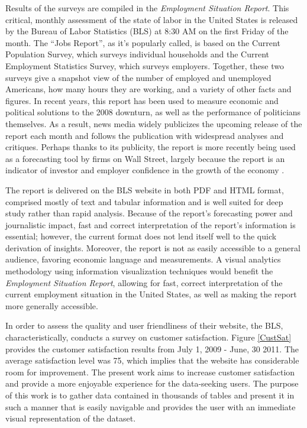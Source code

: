 \documentclass{sigchi}
\begin{document}
Results of the surveys are compiled in the \textit{Employment Situation Report}. This critical, monthly assessment of the state of labor in the United States is released by the Bureau of Labor Statistics (BLS) at 8:30 AM on the first Friday of the month. The ``Jobs Report'', as it's popularly called, is based on the Current Population Survey, which surveys individual households and the Current Employment Statistics Survey, which surveys employers. Together, these two surveys give a snapshot view of the number of employed and unemployed Americans, how many hours they are working, and a variety of other facts and figures. In recent years, this report has been used to measure economic and political solutions to the 2008 downturn, as well as the performance of politicians themselves. As a result, news media widely publicizes the upcoming release of the report each month and follows the publication with widespread analyses and critiques. Perhaps thanks to its publicity, the report is more recently being used as a forecasting tool by firms on Wall Street, largely because the report is an indicator of investor and employer confidence in the growth of the economy \cite{mahorney_what_2013}.

The report is delivered on the BLS website in both PDF and HTML format, comprised mostly of text and tabular information and is well suited for deep study rather than rapid analysis. Because of the report's forecasting power and journalistic impact, fast and correct interpretation of the report's information is essential; however, the current format does not lend itself well to the quick derivation of insights. Moreover, the report is not as easily accessible to a general audience, favoring economic language and measurements. A visual analytics methodology \cite{keim_mastering_2010} using information visualization techniques would benefit the \textit{Employment Situation Report}, allowing for fast, correct interpretation of the current employment situation in the United States, as well as making the report more generally accessible.

In order to assess the quality and user friendliness of their website, the BLS, characteristically, conducts a survey on customer satisfaction. Figure \ref{CustSat} provides the customer satisfaction results from July 1, 2009 - June, 30 2011. The average satisfaction level was 75, which implies that the website has considerable room for improvement. The present work aims to increase customer satisfaction and provide a more enjoyable experience for the data-seeking users. The purpose of this work is to gather data contained in thousands of tables and present it in such a manner that is easily navigable and provides the user with an immediate visual representation of the dataset.
\end{document}
